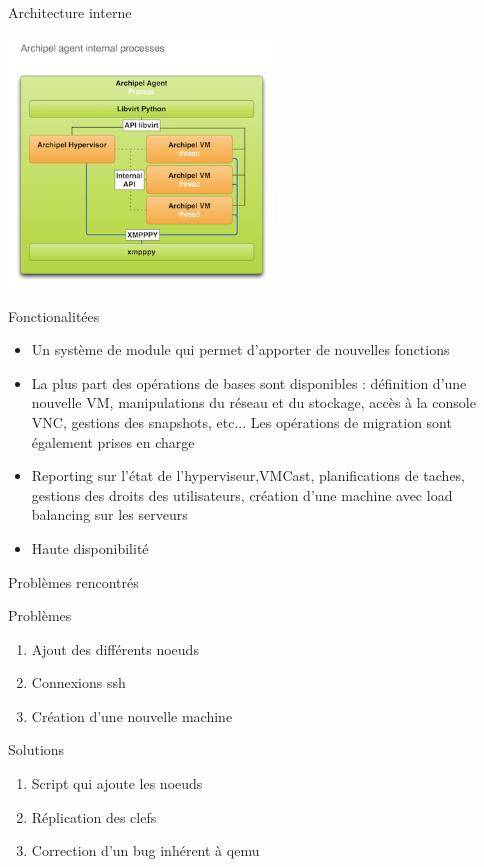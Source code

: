 \begin{frame}{Architecture interne}
\begin{center}
\includegraphics[width=200pt]{images_presentation/intern.png}
\end{center}
\end{frame}

\begin{frame}{Fonctionalitées}
\begin{itemize}
\item Un système de module qui permet d'apporter de nouvelles fonctions
\pause
\item La plus part des opérations de bases sont disponibles : définition d'une nouvelle VM, manipulations du réseau et du stockage,
accès à la console VNC, gestions des snapshots, etc... 
Les opérations de migration sont également prises en charge
\pause
\item Reporting sur l'état de l'hyperviseur,VMCast, planifications de taches, gestions des droits des
utilisateurs, création d'une machine avec load balancing sur les serveurs
\pause
\item Haute disponibilité
\end{itemize}
\end{frame}
\begin{frame}{Problèmes rencontrés}
 \begin{alertblock}{Problèmes}
   \begin{enumerate}
     \item Ajout des différents noeuds
       \pause
     \item Connexions ssh
       \pause
     \item Création d'une nouvelle machine
       \pause
   \end{enumerate}
 \end{alertblock}
\pause
 \begin{exampleblock}{Solutions}
   \begin{enumerate}
     \item Script qui ajoute les noeuds
       \pause
     \item Réplication des clefs
       \pause
     \item Correction d'un bug inhérent à qemu
   \end{enumerate}
 \end{exampleblock}
\end{frame}

